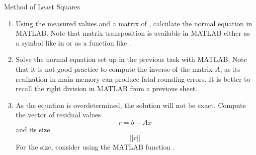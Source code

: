 \begin{task}{Method of Least Squares\up*}{}{}
\begin{enumerate}
\item{
  Using the measured values  and a matrix of
  , calculate the normal equation in MATLAB. Note that matrix transposition is available
  in MATLAB either as a symbol like in  or as a function like .
}
\item{
Solve the normal equation set up in the previous task with MATLAB. Note that it is not good practice to compute the inverse of the matrix $A$, as its realization in main memory can produce fatal rounding errors. It is better to recall the right division in MATLAB from a previous sheet.
  }
\item {
  As the equation is overdetermined, the solution will not be exact. Compute the vector of residual values
  \[
     r = b-Ax
     \]
     and its size
     \[
     ||r||
     \]
     For the size, consider using the MATLAB function .
  }

    
  \end{enumerate}
\end{task}
